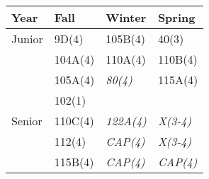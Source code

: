 \documentclass[12pt]{article}
\begin{document}
\begin{center}
\begin{tabular}{|l|l|l|l|}
\hline
Year      & Fall    & Winter & Spring \\
\hline
Junior    & 9D(4)   & 105B(4) & 40(3)   \\
          & 104A(4) & 110A(4) & 110B(4) \\
          & 105A(4) & {\it 80(4)}   & 115A(4) \\
          & 102(1)  &         & \\
\hline
Senior    & 110C(4) & {\it 122A(4)} & {\it X(3-4)}\\
          & 112(4)  & {\it CAP(4)}   & {\it X(3-4)}\\
          & 115B(4) & {\it CAP(4)}   & {\it CAP(4)}\\
\hline 
\end{tabular}
\end{center}
\end{document}
